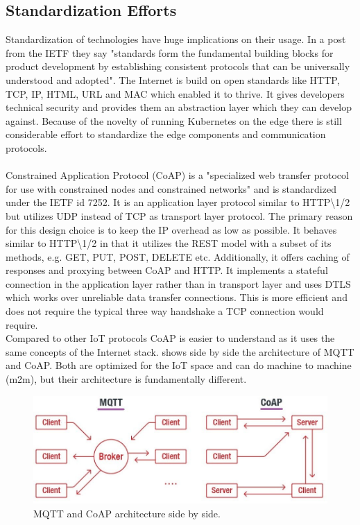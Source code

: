 \subsection{Standardization Efforts}
Standardization of technologies have huge implications on their usage. In a post from the IETF they say "standards form the fundamental building blocks for product development by establishing consistent protocols that can be universally understood and adopted". The Internet is build on open standards like HTTP, TCP, IP, HTML, URL and MAC which enabled it to thrive. It gives developers technical security and provides them an abstraction layer which they can develop against. Because of the novelty of running Kubernetes on the edge there is still considerable effort to standardize the edge components and communication protocols.\\[5mm]
{}\\
Constrained Application Protocol (CoAP) is a "specialized web transfer protocol for use with constrained nodes and constrained networks"\cite{CoAPCon75:online} and is standardized under the IETF id 7252\cite{RFC7252CoAPIETF}. It is an application layer protocol similar to HTTP\textbackslash1/2  but utilizes UDP instead of TCP as transport layer protocol. The primary reason for this design choice is to keep the IP overhead as low as possible. It behaves similar to HTTP\textbackslash1/2 in that it utilizes the REST model with a subset of its methods, e.g. GET, PUT, POST, DELETE etc. Additionally, it offers caching of responses and proxying between CoAP and HTTP. It implements a stateful connection in the application layer rather than in transport layer and uses DTLS which works over unreliable data transfer connections. This is more efficient and does not require the typical three way handshake a TCP connection would require.\\
Compared to other IoT protocols CoAP is easier to understand as it uses the same concepts of the Internet stack.  shows side by side the architecture of MQTT and CoAP. Both are optimized for the IoT space and can do machine to machine (m2m), but their architecture is fundamentally different.
\begin{figure}[h!]
    \centering
    \includegraphics[scale=0.45]{figures/mqtt-vs-coap.jpg}
    \caption{MQTT and CoAP architecture side by side\cite{COAPvsMQTT27:online}.}
    \label{fig:mqttVsCoap}
\end{figure}

